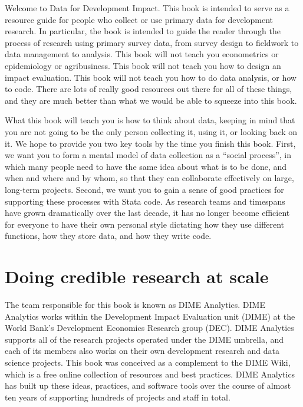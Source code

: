 \begin{fullwidth}
Welcome to Data for Development Impact.
This book is intended to serve as a resource guide
for people who collect or use primary data for development research.
In particular, the book is intended to guide the reader
through the process of research using primary survey data,
from survey design to fieldwork to data management to analysis.
This book will not teach you econometrics or epidemiology or agribusiness.
This book will not teach you how to design an impact evaluation.
This book will not teach you how to do data analysis, or how to code.
There are lots of really good resources out there for all of these things,
and they are much better than what we would be able to squeeze into this book.

What this book will teach you is how to think about data,
keeping in mind that you are not going to be the only person
collecting it, using it, or looking back on it.
We hope to provide you two key tools by the time you finish this book.
First, we want you to form a mental model of data collection as a ``social process'',
in which many people need to have the same idea about what is to be done, and when and where and by whom,
so that they can collaborate effectively on large, long-term projects.
Second, we want you to gain a sense of good practices for supporting these processes with Stata code.
As research teams and timespans have grown dramatically over the last decade,
it has no longer become efficient for everyone to have their own personal style
dictating how they use different functions, how they store data, and how they write code.
\end{fullwidth}


\section{Doing credible research at scale}

The team responsible for this book is known as DIME Analytics.
DIME Analytics works within the Development Impact Evaluation unit (DIME)
at the World Bank's Development Economics Research group (DEC).
DIME Analytics supports all of the research projects operated under the DIME umbrella,
and each of its members also works on their own development research and data science projects.
This book was conceived as a complement to the DIME Wiki,
which is a free online collection of resources and best practices.
DIME Analytics has built up these ideas, practices, and software tools
over the course of almost ten years of supporting hundreds of projects and staff in total.


